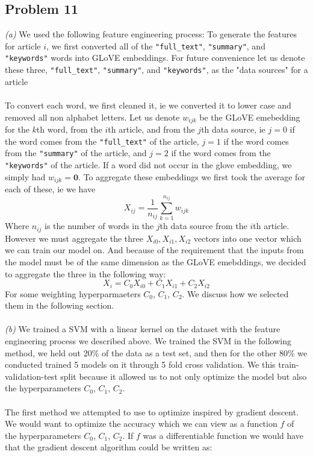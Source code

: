 \documentclass[11pt]{article}
\begin{document}
\begin{multicols}{2}
\subsection*{Problem 11}
\textit{(a)} We used the following feature engineering process: To generate 
the features for article $i$, we first converted all of the  \texttt{"full\_text"}, \texttt{"summary"}, and \texttt{"keywords"} words into GLoVE embeddings. For future convenience let us denote these three, \texttt{"full\_text"}, \texttt{"summary"}, and \texttt{"keywords"}, as the "data sources" for a article\\\\
To convert each word, we first cleaned it, ie we converted it to lower case and removed all non alphabet letters. Let us denote $w_{ijk}$ be the GLoVE emebedding for the $k$th word, from the $i$th article, and from the $j$th data source, ie $j=0$ if the word comes from 
the \texttt{"full\_text"} of the article, $j=1$ if the word comes from the \texttt{"summary"} of the article, and $j=2$ if the word comes from the \texttt{"keywords"} of the article. If a word did not occur in the glove embedding, we simply had $w_{ijk}=\textbf{0}$. To aggregate these embeddings we first took the average for each of these, ie we have 
$$X_{ij}=\frac{1}{n_{ij}}\sum_{k=1}^{n_{ij}} w_{ijk}$$
Where $n_{ij}$ is the number of words in the $j$th data source from the $i$th article. However we must aggregate the three $X_{i0},X_{i1},X_{i2}$ vectors into one vector which we can train our model on. And because of the requirement that the inputs from the model must be of the same dimension
as the GLoVE emebddings, we decided to aggregate the three in the following way:
$$X_i=C_0 X_{i0}+ C_1 X_{i1}+C_2 X_{i2}$$
For some weighting hyperparmaeters $C_0$, $C_1$, $C_2$. We discuss how we selected them in the following section.\\\\
\textit{(b)}
We trained a SVM with a linear kernel on the dataset with the feature engineering process we described above. We trained the SVM in the following method, we held out 20\% of the data as a test set, and then for the other 80\% we conducted trained 5 models on it through 5 fold cross validation. We this train-validation-test split because it allowed us to not only optimize the model but also the hyperparameters $C_0$, $C_1$, $C_2$.\\\\
The first method we attempted to use to optimize inspired by gradient descent. We would want to optimize the accuracy which we can view as a function $f$ of the hyperparameters $C_0$, $C_1$, $C_2$. If $f$ was a differentiable function we would have that the gradient descent algorithm could be written as:

\end{multicols}
\end{document}
